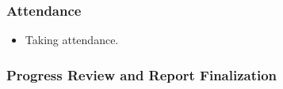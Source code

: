 \documentclass[12pt]{article}
\begin{document}
\hypertarget{attendance-6}{%
\subsubsection{Attendance}\label{attendance-6}}

\begin{itemize}
\tightlist
\item
  Taking attendance.
\end{itemize}

\hypertarget{progress-review-and-report-finalization}{%
\subsubsection{Progress Review and Report
Finalization}\label{progress-review-and-report-finalization}}
\end{document}

